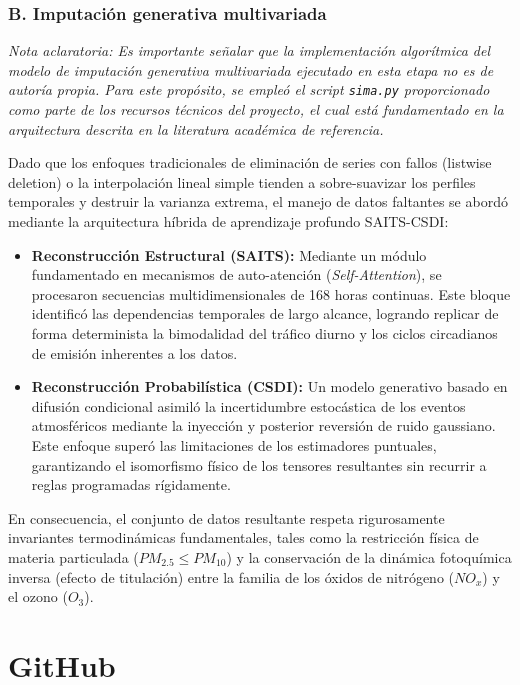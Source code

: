 \documentclass[11pt]{article}
\begin{document}
\subsubsection*{B. Imputación generativa multivariada}

\textit{Nota aclaratoria: Es importante señalar que la implementación algorítmica del modelo de imputación generativa multivariada ejecutado en esta etapa no es de autoría propia. Para este propósito, se empleó el script \texttt{sima.py} proporcionado como parte de los recursos técnicos del proyecto, el cual está fundamentado en la arquitectura descrita en la literatura académica de referencia.}

Dado que los enfoques tradicionales de eliminación de series con fallos (listwise deletion) o la interpolación lineal simple tienden a sobre-suavizar los perfiles temporales y destruir la varianza extrema, el manejo de datos faltantes se abordó mediante la arquitectura híbrida de aprendizaje profundo SAITS-CSDI:
\begin{itemize}
    \item \textbf{Reconstrucción Estructural (SAITS):} Mediante un módulo fundamentado en mecanismos de auto-atención (\textit{Self-Attention}), se procesaron secuencias multidimensionales de 168 horas continuas. Este bloque identificó las dependencias temporales de largo alcance, logrando replicar de forma determinista la bimodalidad del tráfico diurno y los ciclos circadianos de emisión inherentes a los datos.
    \item \textbf{Reconstrucción Probabilística (CSDI):} Un modelo generativo basado en difusión condicional asimiló la incertidumbre estocástica de los eventos atmosféricos mediante la inyección y posterior reversión de ruido gaussiano. Este enfoque superó las limitaciones de los estimadores puntuales, garantizando el isomorfismo físico de los tensores resultantes sin recurrir a reglas programadas rígidamente.
\end{itemize}
En consecuencia, el conjunto de datos resultante respeta rigurosamente invariantes termodinámicas fundamentales, tales como la restricción física de materia particulada ($PM_{2.5} \le PM_{10}$) y la conservación de la dinámica fotoquímica inversa (efecto de titulación) entre la familia de los óxidos de nitrógeno ($NO_x$) y el ozono ($O_3$).

\pagebreak

\appendix

\section{GitHub}
\end{document}
